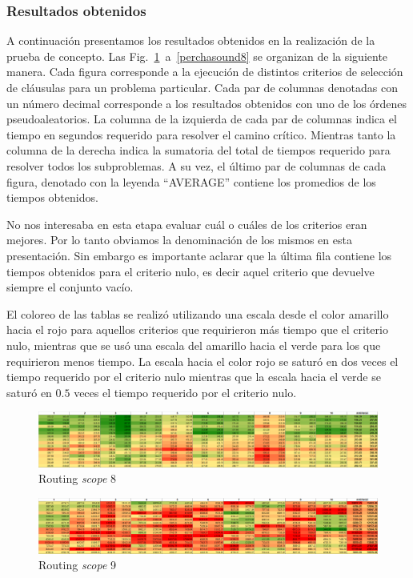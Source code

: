 \subsubsection{Resultados obtenidos}

A continuación presentamos los resultados obtenidos en la realización de la
prueba de concepto. Las Fig.~\ref{perchap8}~a~\ref{perchasound8}  se organizan
de la siguiente manera. Cada figura corresponde a la ejecución de distintos
criterios de selección de cláusulas para un problema particular. Cada par de
columnas denotadas con un número decimal corresponde a los resultados
obtenidos con uno de los órdenes pseudoaleatorios. La columna de la izquierda
de cada par de columnas indica el tiempo en segundos requerido para resolver
el camino crítico. Mientras tanto la columna de la derecha indica la sumatoria
del total de tiempos requerido para resolver todos los subproblemas. A su vez,
el último par de columnas de cada figura, denotado con la leyenda ``AVERAGE''
contiene los promedios de los tiempos obtenidos.

No nos interesaba en esta etapa evaluar cuál o cuáles de los criterios eran
mejores. Por lo tanto obviamos la denominación de los mismos en esta
presentación. Sin embargo es importante aclarar que la última fila contiene
los tiempos obtenidos para el criterio nulo, es decir aquel criterio que
devuelve siempre el conjunto vacío.

El coloreo de las tablas se realizó utilizando una escala desde el color
amarillo hacia el rojo para aquellos criterios que requirieron más tiempo que
el criterio nulo, mientras que se usó una escala del amarillo hacia el verde
para los que requirieron menos tiempo. La escala hacia el color rojo se saturó
en dos veces el tiempo requerido por el criterio nulo mientras que la escala
hacia el verde se saturó en $0.5$ veces el tiempo requerido por el criterio nulo.

\begin{figure}
	\includegraphics[width=\textwidth]{resultados/p8_percha.png}
	\caption{Routing \emph{scope} 8}
	\label{perchap8}
\end{figure}

\begin{figure}
	\includegraphics[width=\textwidth]{resultados/p9_percha.png}
	\caption{Routing \emph{scope} 9}
\end{figure}

